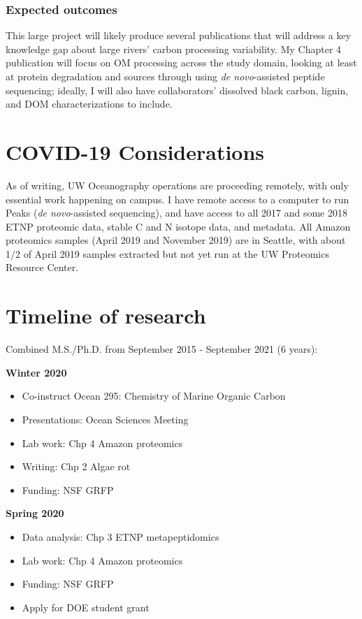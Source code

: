 \documentclass[12pt, letterpaper, twoside]{article}
\begin{document}
\subsubsection*{Expected outcomes}

This large project will likely produce several publications that will address a key knowledge gap about large rivers' carbon processing variability. My Chapter 4 publication will focus on OM processing across the study domain, looking at least at protein degradation and sources through using \textit{de novo}-assisted peptide sequencing; ideally, I will also have collaborators' dissolved black carbon, lignin, and DOM characterizations to include.  

\newpage

\section{COVID-19 Considerations}

As of writing, UW Oceanography operations are proceeding remotely, with only essential work happening on campus. I have remote access to a computer to run Peaks (\textit{de novo}-assisted sequencing), and have access to all 2017 and some 2018 ETNP proteomic data, stable C and N isotope data, and metadata. All Amazon proteomics samples (April 2019 and November 2019) are in Seattle, with about 1/2 of April 2019 samples extracted but not yet run at the UW Proteomics Resource Center. 

\section{Timeline of research}

Combined M.S./Ph.D. from September 2015 - September 2021 (6 years):

\bigskip

\textbf{Winter 2020}
\begin{itemize}
	\item Co-instruct Ocean 295: Chemistry of Marine Organic Carbon
	\item Presentations: Ocean Sciences Meeting
	\item Lab work: Chp 4 Amazon proteomics
	\item Writing: Chp 2 Algae rot
	\item Funding: NSF GRFP
\end{itemize}

\textbf{Spring 2020}
\begin{itemize}
	\item Data analysis: Chp 3 ETNP metapeptidomics
	\item Lab work: Chp 4 Amazon proteomics
	\item Funding: NSF GRFP
	\item Apply for DOE student grant
\end{itemize}
\end{document}
